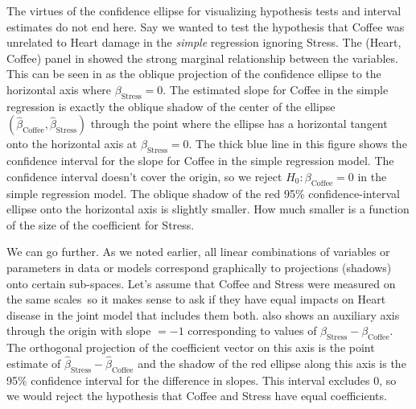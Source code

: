 The virtues of the confidence ellipse for visualizing hypothesis tests and interval estimates
do not end here. Say we wanted to test the hypothesis that Coffee was unrelated to Heart damage
in the \emph{simple} regression ignoring Stress.  The (Heart, Coffee) panel in 
showed the strong marginal relationship between the variables.  This can be seen in  as
the oblique projection of the confidence ellipse to the horizontal axis where $\beta_{\mathrm{Stress}}=0$.
The estimated slope for Coffee in the simple regression is exactly the oblique shadow of
the center of the ellipse $(\widehat{\beta}_{\mathrm{Coffee}}, \widehat{\beta}_{\mathrm{Stress}})$
through the point where the ellipse has a horizontal tangent onto the horizontal axis at
$\beta_{\mathrm{Stress}}=0$. The thick blue line in this figure shows the confidence interval
for the slope for Coffee in the simple regression model. The confidence interval doesn't cover the origin, so
we reject $H_0: \beta_{\mathrm{Coffee}} = 0$ in the simple regression model.
The oblique shadow of the red 95\% confidence-interval ellipse onto the horizontal axis
is slightly smaller.  How much smaller is a function of the size of the coefficient for Stress.

We can go further.  As we noted earlier, all linear combinations of variables or parameters
in data or models correspond graphically to projections (shadows) onto certain sub-spaces.
Let's assume that Coffee and Stress were measured on the same scales\, so it makes sense
to ask if they have equal impacts on Heart disease in the joint model that includes them both.
 also shows an auxiliary axis through the origin with slope $=-1$
corresponding to values of $\beta_{\mathrm{Stress}} - \beta_{\mathrm{Coffee}}$. The orthogonal
projection of the coefficient vector on this axis is the point estimate of
$\widehat{\beta}_{\mathrm{Stress}} - \widehat{\beta}_{\mathrm{Coffee}}$
and the shadow of the red ellipse along this axis is the 95\% confidence interval
for the difference in slopes. This interval excludes 0, so we would reject the hypothesis
that Coffee and Stress have equal coefficients.

